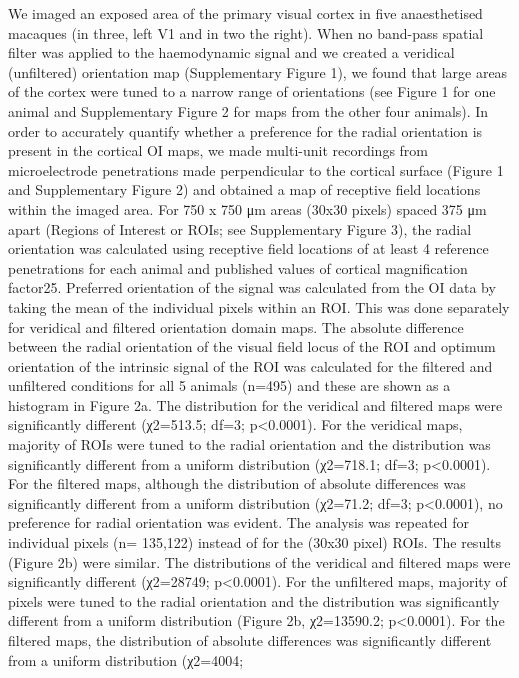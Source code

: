 	We imaged an exposed area of the primary visual cortex in five anaesthetised macaques (in
	three, left V1 and in two the right). When no band-pass spatial filter was applied to the
	haemodynamic signal and we created a veridical (unfiltered) orientation map (Supplementary
	Figure 1), we found that large areas of the cortex were tuned to a narrow range of orientations
	(see Figure 1 for one animal and Supplementary Figure 2 for maps from the other four
	animals). In order to accurately quantify whether a preference for the radial orientation is present
	in the cortical OI maps, we made multi-unit recordings from microelectrode penetrations made
	perpendicular to the cortical surface (Figure 1 and Supplementary Figure 2) and obtained a
	map of receptive field locations within the imaged area. For 750 x 750 μm areas (30x30 pixels)
	spaced 375 μm apart (Regions of Interest or ROIs; see Supplementary Figure 3), the radial
	orientation was calculated using receptive field locations of at least 4 reference penetrations for
	each animal and published values of cortical magnification factor25. Preferred orientation of the
	signal was calculated from the OI data by taking the mean of the individual pixels within an ROI.
	This was done separately for veridical and filtered orientation domain maps. The absolute
	difference between the radial orientation of the visual field locus of the ROI and optimum
	orientation of the intrinsic signal of the ROI was calculated for the filtered and unfiltered
	conditions for all 5 animals (n=495) and these are shown as a histogram in Figure 2a. The
	distribution for the veridical and filtered maps were significantly different (χ2=513.5; df=3;
	p<0.0001). For the veridical maps, majority of ROIs were tuned to the radial orientation and the
	distribution was significantly different from a uniform distribution (χ2=718.1; df=3; p<0.0001).
	For the filtered maps, although the distribution of absolute differences was significantly different
	from a uniform distribution (χ2=71.2; df=3; p<0.0001), no preference for radial orientation was
	evident. The analysis was repeated for individual pixels (n= 135,122) instead of for the (30x30
	pixel) ROIs. The results (Figure 2b) were similar. The distributions of the veridical and filtered
	maps were significantly different (χ2=28749; p<0.0001). For the unfiltered maps, majority of
	pixels were tuned to the radial orientation and the distribution was significantly different from a
	uniform distribution (Figure 2b, χ2=13590.2; p<0.0001). For the filtered maps, the distribution
	of absolute differences was significantly different from a uniform distribution (χ2=4004;
